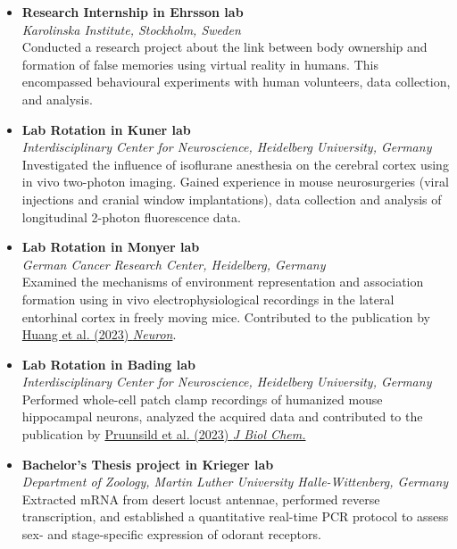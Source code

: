 \documentclass[12pt]{article}
\begin{document}
\begin{itemize}
    \item[\textbf{08/2022 -- 11/2022}] \textbf{Research Internship in Ehrsson lab} \\
    \textit{Karolinska Institute, Stockholm, Sweden} \\
    Conducted a research project about the link between body ownership and formation of
    false memories using virtual reality in humans. This encompassed behavioural experiments with human volunteers, data collection, and analysis.

    \item[\textbf{05/2022 -- 07/2022}] \textbf{Lab Rotation in Kuner lab} \\
    \textit{Interdisciplinary Center for Neuroscience, Heidelberg University, Germany} \\
    Investigated the influence of isoflurane anesthesia on the cerebral cortex using in vivo two-photon imaging. Gained experience in mouse neurosurgeries (viral injections and cranial window implantations), data collection and analysis of longitudinal 2-photon fluorescence data.

    \item[\textbf{02/2022 -- 04/2022}] \textbf{Lab Rotation in Monyer lab} \\
    \textit{German Cancer Research Center, Heidelberg, Germany} \\
    Examined the mechanisms of environment representation and association formation using in vivo electrophysiological recordings in the lateral entorhinal cortex in freely moving mice. Contributed to the publication by \href{https://doi.org/10.1016/j.neuron.2023.06.020}{Huang et al. (2023) \textit{Neuron}}.

    \item[\textbf{10/2021 -- 01/2022}] \textbf{Lab Rotation in Bading lab} \\
    \textit{Interdisciplinary Center for Neuroscience, Heidelberg University, Germany} \\
    Performed whole-cell patch clamp recordings of humanized mouse hippocampal neurons, analyzed the acquired data and contributed to the publication by \href{https://doi.org/10.1016/j.jbc.2023.104671}{Pruunsild et al. (2023) \textit{J Biol Chem.}} 

    \item[\textbf{03/2021 -- 09/2021}] \textbf{Bachelor's Thesis project in Krieger lab} \\
    \textit{Department of Zoology, Martin Luther University Halle-Wittenberg, Germany} \\
    Extracted mRNA from desert locust antennae, performed reverse transcription, and established a quantitative real-time PCR protocol to assess sex- and stage-specific expression of odorant receptors.


\end{itemize}
\end{document}
